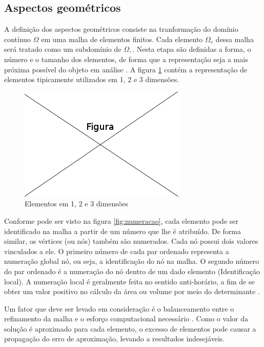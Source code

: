 \subsection{Aspectos geométricos} 
A definição dos aspectos geométricos consiste na tranformação do domínio contínuo $\Omega$ em uma malha de elementos finitos. Cada elemento $\Omega_e$ dessa malha será tratado como um subdomínio de $\Omega,$.  
Nesta etapa são definidas a forma, o número e o tamanho dos elementos, de forma que a representação seja a mais próxima possível do objeto em análise \citep[p. 154]{desai}.
A figura \ref{fig:elementos} contém a representação de elementos tipicamente utilizados em 1, 2 e 3 dimensões. 

\begin{figure}[!htb]
\centering
\includegraphics[scale=0.5]{figuras/temp.png}
\caption{Elementos em 1, 2 e 3 dimensões}
\label{fig:elementos}
\end{figure}

Conforme pode ser visto na figura \ref{fig:numeracao}, cada elemento pode ser identificado na malha a partir de um número que lhe é atribuído. De forma similar, os vértices (ou nós) também são numerados. Cada nó possui dois valores vinculados a ele. 
O primeiro número de cada par ordenado representa a numeração global nó, ou seja, a identificação do nó na malha. O segundo número do par ordenado é a numeração do nó dentro de um dado elemento (Identificação local). A numeração local é geralmente feita no sentido anti-horário, a fim de se obter um valor positivo no cálculo da área ou volume por meio do  determinante \citep[p. 394]{sadiku}. 

Um fator que deve ser levado em consideração é o balanceamento entre o refinamento da malha e o esforço computacional necessário \citep[p. 154]{desai}. Como o valor da solução é aproximado para cada elemento, o excesso de elementos pode causar a propagação do erro de aproximação, levando a resultados indesejáveis.


